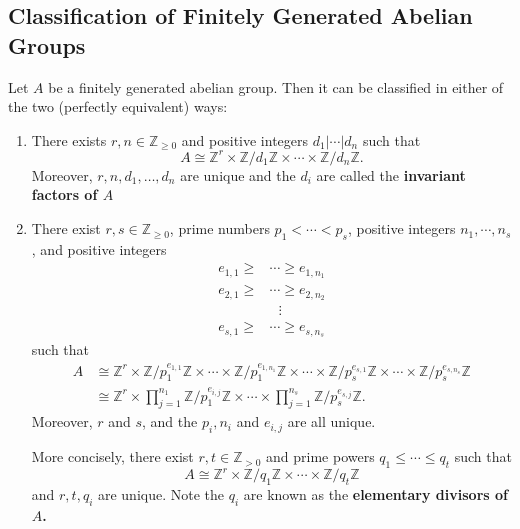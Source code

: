 \documentclass{article}
\begin{document}
\subsection{Classification of Finitely Generated Abelian Groups}
\begin{idea}
    Let $A$ be a finitely generated abelian group. Then it can be classified in either of the two (perfectly equivalent) ways:
    \begin{enumerate}
        \item There exists $r,n\in \mathbb{Z}_{\ge 0}$ and positive integers $d_1|\cdots |d_n$ such that 
        \begin{equation}
            A \cong \mathbb{Z}^r \times \mathbb{Z}/d_1\mathbb{Z} \times \cdots \times \mathbb{Z}/d_n\mathbb{Z}.
        \end{equation}
        Moreover, $r,n,d_1,\dots,d_n$ are unique and the $d_i$ are called the \textbf{invariant factors of $A$}
        \item There exist $r,s \in \mathbb{Z}_{\ge 0}$, prime numbers $p_1 < \cdots <p_s$, positive integers $n_1,\cdots, n_s$, and positive integers
        \begin{align*}
            e_{1,1} \ge &\cdots \ge e_{1,n_1} \\ 
            e_{2,1} \ge &\cdots \ge e_{2,n_2} \\ 
            &\,\,\,\,\vdots \\ 
            e_{s,1} \ge &\cdots \ge e_{s,n_s}
        \end{align*}
        such that 
        \begin{align*}
            A &\cong \mathbb{Z}^r \times \mathbb{Z}/p_1^{e_{1,1}}\mathbb{Z} \times \cdots \times \mathbb{Z}/p_1^{e_{1,n_1}}\mathbb{Z} \times \cdots \times \mathbb{Z}/p_s^{e_{s,1}}\mathbb{Z} \times \cdots \times \mathbb{Z}/p_s^{e_{s,n_s}}\mathbb{Z} \\ 
            &\cong \mathbb{Z}^r \times \prod_{j=1}^{n_1}\mathbb{Z}/p_1^{e_{i,j}}\mathbb{Z} \times \cdots \times \prod_{j=1}^{n_s}\mathbb{Z}/p_s^{e_{s,j}}\mathbb{Z}.
        \end{align*}
        Moreover, $r$ and $s$, and the $p_i,n_i$ and $e_{i,j}$ are all unique.
        \vspace{2mm}

        More concisely, there exist $r,t\in \mathbb{Z}_{>0}$ and prime powers $q_1\le \cdots \le q_t$ such that 
        \begin{equation}
            A \cong \mathbb{Z}^r \times \mathbb{Z}/q_1\mathbb{Z} \times \cdots \times \mathbb{Z}/q_t\mathbb{Z}
        \end{equation}
        and $r,t,q_i$ are unique. Note the $q_i$ are known as the \textbf{elementary divisors of $A$.}
    \end{enumerate}
\end{idea}
\end{document}
